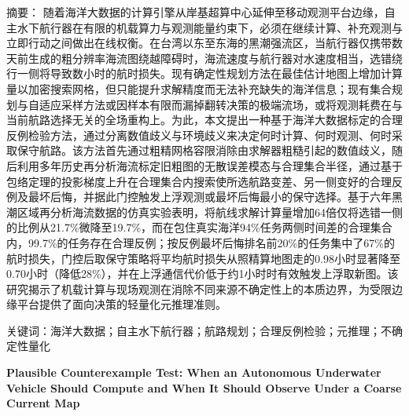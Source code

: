 {\heiti 摘要：}
随着海洋大数据的计算引擎从岸基超算中心延伸至移动观测平台边缘，自主水下航行器在有限的机载算力与观测能量约束下，必须在继续计算、补充观测与立即行动之间做出在线权衡。在台湾以东至东海的黑潮强流区，当航行器仅携带数天前生成的粗分辨率海流图绕越障碍时，海流速度与航行器对水速度相当，选错绕行一侧将导致数小时的航时损失。现有确定性规划方法在最佳估计地图上增加计算量以加密搜索网格，但只能提升求解精度而无法补充缺失的海洋信息；现有集合规划与自适应采样方法或因样本有限而漏掉翻转决策的极端流场，或将观测耗费在与当前航路选择无关的全场重构上。为此，本文提出一种基于海洋大数据标定的合理反例检验方法，通过分离数值歧义与环境歧义来决定何时计算、何时观测、何时采取保守航路。该方法首先通过粗精网格容限消除由求解器粗糙引起的数值歧义，随后利用多年历史再分析海流标定旧粗图的无散误差模态与合理集合半径，通过基于包络定理的投影梯度上升在合理集合内搜索使所选航路变差、另一侧变好的合理反例及最坏后悔，并据此门控触发上浮观测或最坏后悔最小的保守选择。基于六年黑潮区域再分析海流数据的仿真实验表明，将航线求解计算量增加64倍仅将选错一侧的比例从21.7\%微降至19.7\%，而在包住真实海洋94\%任务两侧时间差的合理集合内，99.7\%的任务存在合理反例；按反例最坏后悔排名前20\%的任务集中了67\%的航时损失，门控后取保守策略将平均航时损失从照精算地图走的0.98小时显著降至0.70小时（降低28\%），并在上浮通信代价低于约1小时时有效触发上浮取新图。该研究揭示了机载计算与现场观测在消除不同来源不确定性上的本质边界，为受限边缘平台提供了面向决策的轻量化元推理准则。

{\heiti 关键词：}海洋大数据；自主水下航行器；航路规划；合理反例检验；元推理；不确定性量化

\vspace{1em}
\begin{center}
{\large\bfseries Plausible Counterexample Test: When an Autonomous Underwater Vehicle Should Compute and When It Should Observe Under a Coarse Current Map}
\end{center}
\vspace{0.5em}

